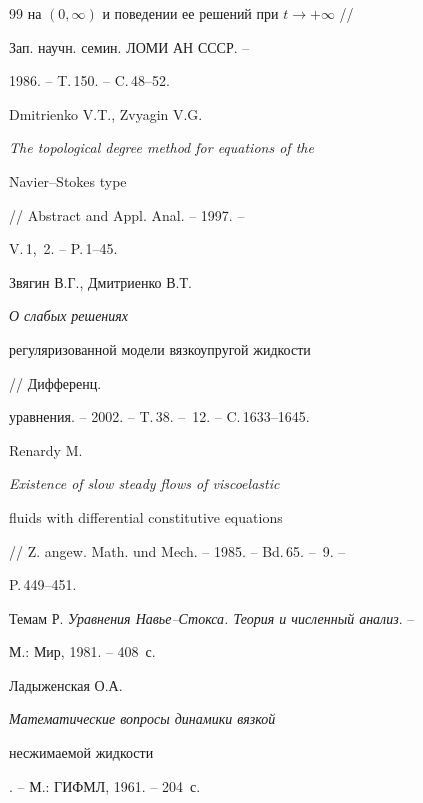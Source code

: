 \begin{thebibliography}{99}
{на $(0,\infty)$ и поведении ее решений при $t\to+\infty$} //


Зап. научн. семин. ЛОМИ АН СССР. --


1986. -- T.\,150. -- C.\,48--52.







Dmitrienko V.T., Zvyagin V.G. 


{\em The topological degree method for equations of the 


Navier--Stokes type} // Abstract and Appl. Anal. -- 1997. --


V.\,1,~2. -- P.\,1--45.







Звягин В.Г., Дмитриенко В.Т. {\em О слабых решениях


регуляризованной модели вязкоупругой жидкости} // Дифференц.


уравнения. -- 2002. -- T.\,38. -- \No\,12. -- C.\,1633--1645.







Renardy M. {\em Existence of slow steady flows of viscoelastic 


fluids with differential constitutive equations}


// Z. angew. Math. und Mech. -- 1985. -- Bd.\,65. -- \No\,9. --


P.\,449--451.







Темам Р. {\em Уравнения Навье--Стокса. Теория и численный анализ}. --


М.: Мир, 1981. -- 408~с.







Ладыженская О.А. {\em Математические вопросы динамики вязкой


несжимаемой жидкости}. -- М.: ГИФМЛ, 1961. -- 204~с.





\end{thebibliography}





\vskip 2cm












\label{end}





